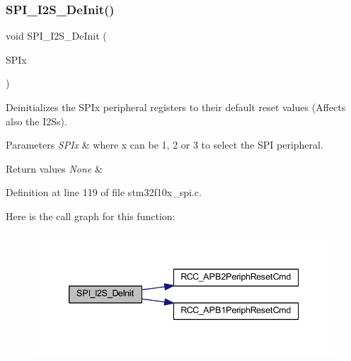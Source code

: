 \subsubsection{\texorpdfstring{S\+P\+I\+\_\+\+I2\+S\+\_\+\+De\+Init()}{SPI\_I2S\_DeInit()}}
{\footnotesize\ttfamily void S\+P\+I\+\_\+\+I2\+S\+\_\+\+De\+Init (\begin{DoxyParamCaption}\item[{\hyperlink{struct_s_p_i___type_def}{S\+P\+I\+\_\+\+Type\+Def} $\ast$}]{S\+P\+Ix }\end{DoxyParamCaption})}



Deinitializes the S\+P\+Ix peripheral registers to their default reset values (Affects also the I2\+Ss). 


\begin{DoxyParams}{Parameters}
{\em S\+P\+Ix} & where x can be 1, 2 or 3 to select the S\+PI peripheral. \\
\hline
\end{DoxyParams}

\begin{DoxyRetVals}{Return values}
{\em None} & \\
\hline
\end{DoxyRetVals}


Definition at line 119 of file stm32f10x\+\_\+spi.\+c.

Here is the call graph for this function\+:
\nopagebreak
\begin{figure}[H]
\begin{center}
\leavevmode
\includegraphics[width=339pt]{group___s_p_i___exported___functions_gabe36880945fa56785283a9c0092124cc_cgraph}
\end{center}
\end{figure}
\mbox{\label{group___s_p_i___exported___functions_gabed5b91a8576e6d578f364cc0e807e4a}} 
